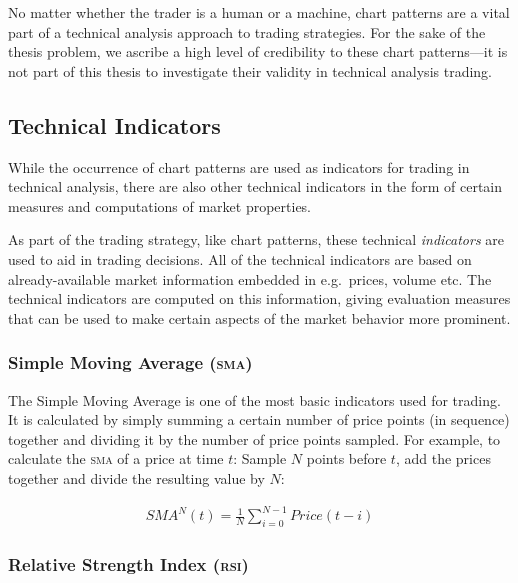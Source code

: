 \begin{multicols}{2}
No matter whether the trader is a human or a machine, chart patterns are a vital
part of a technical analysis approach to trading strategies. For the sake of the
thesis problem, we ascribe a high level of credibility to these chart
patterns---it is not part of this thesis to investigate their validity in
technical analysis trading.

\subsection{Technical Indicators}

While the occurrence of chart patterns are used as indicators for trading in
technical analysis, there are also other technical indicators in the form of
certain measures and computations of market properties.

As part of the trading strategy, like chart patterns, these technical
\textit{indicators} are used to aid in trading decisions.  All of the technical
indicators are based on already-available market information embedded in
e.g.\ prices, volume etc.  The technical indicators are computed on this
information, giving evaluation measures that can be used to make certain aspects
of the market behavior more prominent.

\subsubsection{Simple Moving Average (\textsc{sma})}

The Simple Moving Average is one of the most basic indicators used for trading.
It is calculated by simply summing a certain number of price points (in
sequence) together and dividing it by the number of price points sampled.  For
example, to calculate the \textsc{sma} of a price at time $t$: Sample $N$ points
before $t$, add the prices together and divide the resulting value by $N$:

\begin{Figure}
  \begin{align*}
    \mathit{SMA^N}(t) = \frac{1}{N}\sum\limits_{i=0}^{N-1} \mathit{Price(t-i)}
  \end{align*}
\end{Figure}

\subsubsection{Relative Strength Index (\textsc{rsi})}


\end{multicols}
